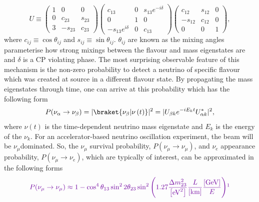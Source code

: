 \begin{equation}
U \equiv
\begin{pmatrix}
1 & 0 & 0 \\
0 & c_{23} & s_{23} \\
3 & -s_{23} & c_{23}
\end{pmatrix}
\begin{pmatrix}
c_{13} & 0 & s_{13}e^{-i\delta} \\
0 & 1 & 0 \\
-s_{13}e^{i\delta} & 0 & c_{13} 
\end{pmatrix}
\begin{pmatrix}
c_{12} & s_{12} & 0 \\
-s_{12} & c_{12} & 0 \\
0 & 0 & 1
\end{pmatrix}
,
\label{eq:PMNSMatrix}
\end{equation}
where $c_{ij} \equiv \cos\theta_{ij}$ and $s_{ij} \equiv \sin\theta_{ij}$. $\theta_{ij}$ are known as the mixing angles  parameterise how strong mixings between the flavour and mass eigenstates are and $\delta$ is a CP violating phase.  The most surprising observable feature of this mechanism is the non-zero probability to detect a neutrino of specific flavour which was created at source in a different flavour state.  By propagating the mass eigenstates through time, one can arrive at this probability which has the following form
\begin{equation}
P(\nu_\alpha \rightarrow \nu_\beta) = |\braket{\nu_\beta|\nu\left(t\right)}|^2 = |U_{\beta k} e^{-iE_{k}t}  U^{\ast}_{\alpha k}|^2,
\label{eq:NeutrinoOscillationProbability}
\end{equation}
where $\nu\left(t\right)$ is the time-dependent neutrino mass eigenstate and $E_k$ is the energy of the $\nu_k$.  For an accelerator-based neutrino oscillation experiment, the beam will be $\nu_\mu$dominated.  So, the $\nu_\mu$ survival probability, $P(\nu_\mu \rightarrow \nu_\mu)$, and $\nu_e$ appearance probability, $P(\nu_\mu \rightarrow \nu_e)$, which are typically of interest, can be approximated in the following forms
\begin{equation}
  \Yoshi{P(\nu_\mu \rightarrow \nu_\mu) \approx 1 - \cos^{4}\theta_{13}\sin^{2}2\theta_{23}\sin^2\left(1.27\frac{\Delta m^{2}_{23}}{\left[\textrm{eV}^2\right]}\frac{L}{\left[\textrm{km}\right]}\frac{\left[\textrm{GeV}\right]}{E}\right)}{ADDRESSED - would units not be in square brackets?}
  \label{eq:MuonNeutrinoSurvivalProbability}
\end{equation}
